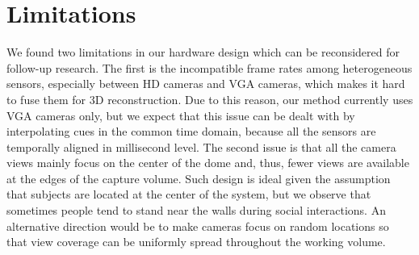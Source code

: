 \section{Limitations}
We found two limitations in our hardware design which can be reconsidered for follow-up research. The first is the incompatible frame rates among heterogeneous sensors, especially between HD cameras and VGA cameras, which makes it hard to fuse them for 3D reconstruction. Due to this reason, our method currently uses VGA cameras only, but we expect that this issue can be dealt with by interpolating cues in  the common time domain, because all the sensors are temporally aligned in millisecond level. The second issue is that all the camera views mainly focus on the center of the dome and, thus, fewer views are available at the edges of the capture volume. Such design is ideal given the assumption that subjects are located at the center of the system, but we observe that sometimes people tend to stand near the walls during social interactions. An alternative direction would be to make cameras focus on random locations so that view coverage can be uniformly spread throughout the working volume. 


%
%




\pagebreak